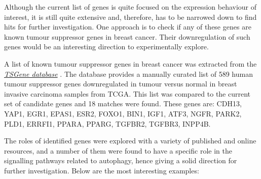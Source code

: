 \newline

Although the current list of genes is quite focused on the expression behaviour of interest, it is still quite extensive and, therefore, has to be narrowed down to find hits for further investigation.  One approach is to check if any of these genes are known tumour suppressor genes in breast cancer. Their downregulation of such genes would be an interesting direction to experimentally explore. 

A list of known tumour suppressor genes in breast cancer was extracted from the \hyperlink{https://bioinfo.uth.edu/TSGene/}{\textit{TSGene database}} \cite{Zhao2016TSGeneGenes}. The database provides a manually curated list of 589 human tumour suppressor genes downregulated in tumour versus normal in breast invasive carcinoma samples from TCGA. This list was compared to the current set of candidate genes and 18 matches were found. These genes are: CDH13, YAP1, EGR1, EPAS1, ESR2, FOXO1, BIN1, IGF1, ATF3, NGFR, PARK2, PLD1, ERRFI1, PPARA, PPARG, TGFBR2, TGFBR3, INPP4B. 

The roles of identified genes were explored with a variety of published and online resources, and a number of them were found to have a specific role in the signalling pathways related to autophagy, hence giving a solid direction for further investigation. Below are the most interesting examples:

